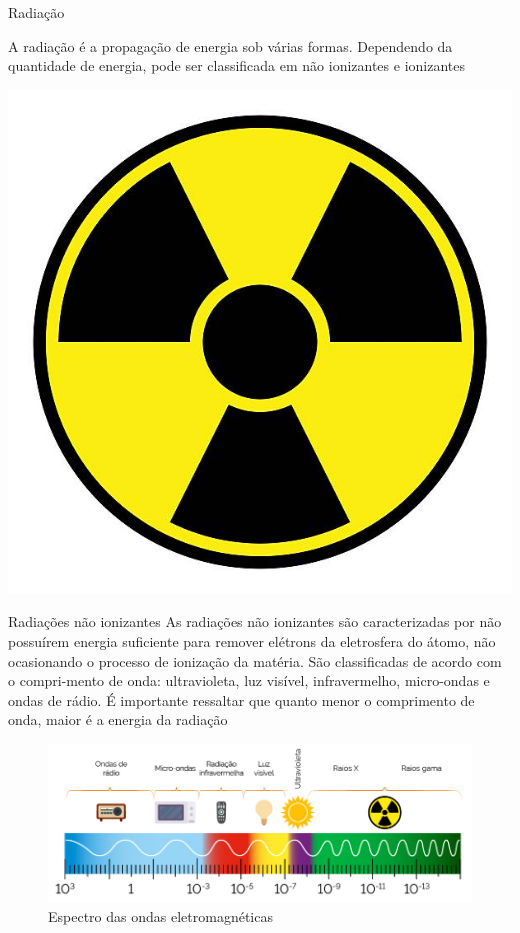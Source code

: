 \documentclass[presentation]{beamer}
\begin{document}
\begin{frame}[label={sec:org923748c}]{Radiação}
\begin{block}{}
A  radiação  é  a  propagação  de  energia  sob  várias  formas.  Dependendo  da  quantidade de energia, pode ser classificada em não ionizantes e ionizantes

\begin{center}
\includegraphics[scale=0.5]{./RadiacaoSymbol.jpg}
\end{center}
\end{block}

\begin{block}{Radiações não ionizantes}
As radiações não ionizantes são caracterizadas por não possuírem energia suficiente para remover elétrons da eletrosfera do átomo, não ocasionando o processo de ionização da matéria. São classificadas de acordo com o compri-mento de onda: ultravioleta, luz visível, infravermelho, micro-ondas e ondas de rádio.  É  importante  ressaltar  que  quanto  menor  o  comprimento  de  onda, maior é a energia da radiação

\begin{figure}[htbp]
\centering
\includegraphics[scale=0.3]{./espectro.png}
\caption{\label{fig:orga4e2667}Espectro das ondas eletromagnéticas}
\end{figure}
\end{block}



\end{frame}
\end{document}
